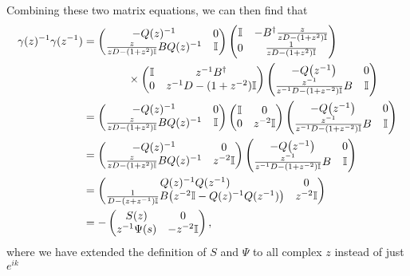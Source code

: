 \documentclass[../thesis-main/thesis-main]{subfiles}
\begin{document}
Combining these two matrix equations, we can then find that
\begin{align}
  \gamma (z)^{-1} \gamma(z^{-1}) &= \begin{pmatrix}
      - Q(z)^{-1} & 0\\
      \frac{z}{z D - (1+z^2)\mathbb{I}} B Q(z)^{-1} & \mathbb{I}
    \end{pmatrix}
    \begin{pmatrix}
      \mathbb{I} & - B^{\dag} \frac{z}{zD - (1+z^2)\mathbb{I}}\\
      0 & \frac{1}{zD - (1+z^2)\mathbb{I}}
    \end{pmatrix}\nonumber\\
  &\qquad \qquad \times
    \begin{pmatrix} \mathbb{I} & z^{-1}B^\dag\\
    0 & z^{-1} D - (1+ z^{-2}) \mathbb{I} \end{pmatrix}
    \begin{pmatrix} - Q\big(z^{-1}\big) & 0\\
      \frac{z^{-1}}{z^{-1}D - (1+ z^{-2})\mathbb{I}}B & \mathbb{I}\end{pmatrix} \\
  &=  \begin{pmatrix}
      - Q(z)^{-1} & 0\\
      \frac{z}{z D - (1+z^2)\mathbb{I}} B Q(z)^{-1} & \mathbb{I}
    \end{pmatrix}
    \begin{pmatrix}
      \mathbb{I} & 0\\
      0 &z^{-2}\mathbb{I} \end{pmatrix}
    \begin{pmatrix} - Q\big(z^{-1}\big) & 0\\
      \frac{z^{-1}}{z^{-1}D - (1+ z^{-2})\mathbb{I}}B & \mathbb{I}\end{pmatrix} \\
   &= \begin{pmatrix}
      - Q(z)^{-1} & 0\\
      \frac{z}{z D - (1+z^2)\mathbb{I}} B Q(z)^{-1} &z^{-2} \mathbb{I}
    \end{pmatrix}
    \begin{pmatrix} - Q\big(z^{-1}\big) & 0\\
      \frac{z^{-1}}{z^{-1}D - (1+ z^{-2})\mathbb{I}}B & \mathbb{I}\end{pmatrix} \\
  &= \begin{pmatrix}
      Q(z)^{-1}Q(z^{-1}) & 0\\
      \frac{1}{D - (z+z^{-1})\mathbb{I} }B \big(z^{-2} \mathbb{I} - Q(z)^{-1}Q(z^{-1}) \big) & z^{-2}\mathbb{I}
    \end{pmatrix}\\
  &= -\begin{pmatrix}
      S(z) & 0\\
     z^{-1} \Psi(s) & -z^{-2}\mathbb{I}
    \end{pmatrix},\label{eq:gamma_gives_S}
\end{align}
where we have extended the definition of $S$ and $\Psi$ to all complex $z$ instead of just $e^{ik}$
\end{document}
